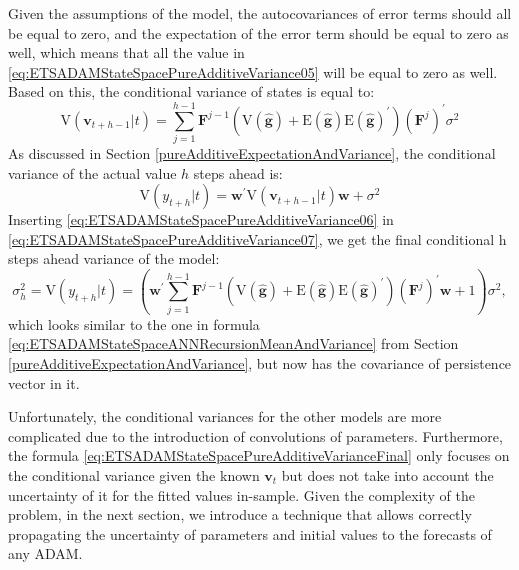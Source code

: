 \documentclass[
]{book}
\theoremstyle{definition}
\theoremstyle{definition}
\theoremstyle{definition}
\theoremstyle{definition}
\theoremstyle{remark}
\begin{document}
Given the assumptions of the model, the autocovariances of error terms should all be equal to zero, and the expectation of the error term should be equal to zero as well, which means that all the value in \eqref{eq:ETSADAMStateSpacePureAdditiveVariance05} will be equal to zero as well. Based on this, the conditional variance of states is equal to:
\begin{equation}
    \mathrm{V}(\mathbf{v}_{t+h-1}|t) = \sum_{j=1}^{h-1} \mathbf{F}^{j-1} \left( \mathrm{V} (\hat{\mathbf{g}}) + \mathrm{E} (\hat{\mathbf{g}}) \mathrm{E} (\hat{\mathbf{g}})^\prime \right) (\mathbf{F}^{j})^\prime \sigma^2
  \label{eq:ETSADAMStateSpacePureAdditiveVariance06}
\end{equation}
As discussed in Section \ref{pureAdditiveExpectationAndVariance}, the conditional variance of the actual value \(h\) steps ahead is:
\begin{equation}
    \mathrm{V}(y_{t+h}|t) = \mathbf{w}^\prime \mathrm{V}(\mathbf{v}_{t+h-1}|t) \mathbf{w} + \sigma^2
  \label{eq:ETSADAMStateSpacePureAdditiveVariance07}
\end{equation}
Inserting \eqref{eq:ETSADAMStateSpacePureAdditiveVariance06} in \eqref{eq:ETSADAMStateSpacePureAdditiveVariance07}, we get the final conditional h steps ahead variance of the model:
\begin{equation}
    \sigma^2_h = \mathrm{V}(y_{t+h}|t) = \left(\mathbf{w}^\prime \sum_{j=1}^{h-1} \mathbf{F}^{j-1} \left( \mathrm{V} (\hat{\mathbf{g}}) + \mathrm{E} (\hat{\mathbf{g}}) \mathrm{E} (\hat{\mathbf{g}})^\prime \right) (\mathbf{F}^{j})^\prime \mathbf{w} + 1 \right)\sigma^2,
  \label{eq:ETSADAMStateSpacePureAdditiveVarianceFinal}
\end{equation}
which looks similar to the one in formula \eqref{eq:ETSADAMStateSpaceANNRecursionMeanAndVariance} from Section \ref{pureAdditiveExpectationAndVariance}, but now has the covariance of persistence vector in it.

Unfortunately, the conditional variances for the other models are more complicated due to the introduction of convolutions of parameters. Furthermore, the formula \eqref{eq:ETSADAMStateSpacePureAdditiveVarianceFinal} only focuses on the conditional variance given the known \(\mathbf{v}_t\) but does not take into account the uncertainty of it for the fitted values in-sample. Given the complexity of the problem, in the next section, we introduce a technique that allows correctly propagating the uncertainty of parameters and initial values to the forecasts of any ADAM.
\end{document}
